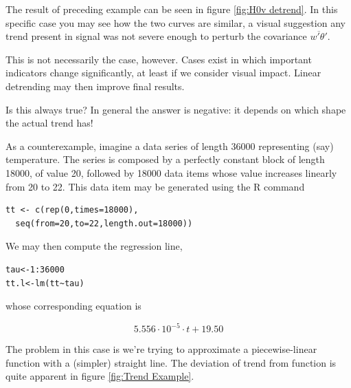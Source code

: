 \documentclass[a4paper,10pt]{book}
\begin{document}
The result of preceding example can be seen in figure \ref{fig:H0v detrend}. In this specific case you may see how the two curves are similar, a visual suggestion any trend present in signal was not severe enough to perturb the covariance $\overline{w'\theta'}$.

This is not necessarily the case, however. Cases exist in which important indicators change significantly, at least if we consider visual impact. Linear detrending may then improve final results.

Is this always true? In general the answer is negative: it depends on which shape the actual trend has!

As a counterexample, imagine a data series of length 36000 representing (say) temperature. The series is composed by a perfectly constant block of length 18000, of value 20, followed by 18000 data items whose value increases linearly from 20 to 22. This data item may be generated using the R command

\begin{verbatim}
tt <- c(rep(0,times=18000),
  seq(from=20,to=22,length.out=18000))
\end{verbatim}

We may then compute the regression line,

\begin{verbatim}
tau<-1:36000
tt.l<-lm(tt~tau)
\end{verbatim}

\noindent whose corresponding equation is

\begin{equation}
 5.556 \cdot 10^{-5} \cdot t + 19.50
\end{equation}

The problem in this case is we're trying to approximate a piecewise-linear function with a (simpler) straight line. The deviation of trend from function is quite apparent in figure \ref{fig:Trend Example}.
\end{document}
